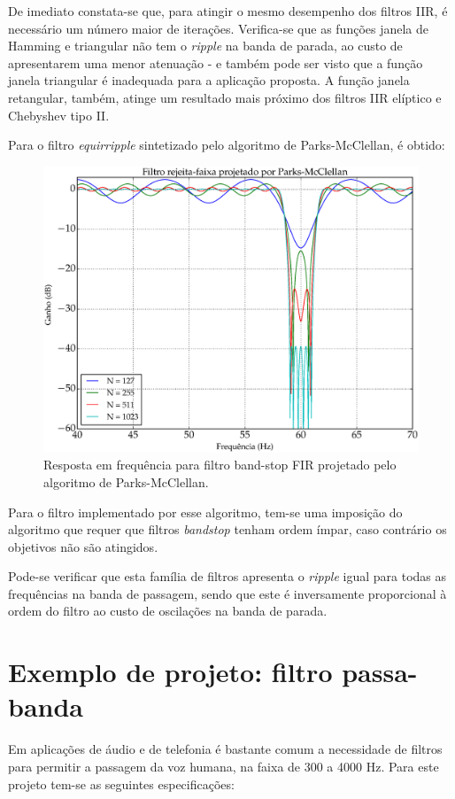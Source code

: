 De imediato constata-se que, para atingir o mesmo desempenho dos filtros IIR, é necessário um número maior de iterações. Verifica-se que as funções janela de Hamming e triangular não tem o \textit{ripple} na banda de parada, ao custo de apresentarem uma menor atenuação - e também pode ser visto que a função janela triangular é inadequada para a aplicação proposta. A função janela retangular, também, atinge um resultado mais próximo dos filtros IIR elíptico e Chebyshev tipo II.

\newpage

Para o filtro \textit{equirripple} sintetizado pelo algoritmo de Parks-McClellan, é obtido: 

\begin{figure}[H]
  \centering
  \includegraphics[scale=0.55]{images/plots/bandstop_fir_pm}
  \caption{Resposta em frequência para filtro band-stop FIR projetado pelo algoritmo de Parks-McClellan.}
  \label{fig:bandstop_FIR_pm}
\end{figure}

Para o filtro implementado por esse algoritmo, tem-se uma imposição do algoritmo que requer que filtros \textit{bandstop} tenham ordem ímpar, caso contrário os objetivos não são atingidos.

Pode-se verificar que esta família de filtros apresenta o \textit{ripple} igual para todas as frequências na banda de passagem,  sendo que este é inversamente proporcional à ordem do filtro ao custo de oscilações na banda de parada.

\newpage
\section{Exemplo de projeto: filtro passa-banda}
\label{sec:bandpass}
Em aplicações de áudio e de telefonia é bastante comum a necessidade de filtros para permitir a passagem da voz humana, na faixa de 300 a 4000 Hz. Para este projeto tem-se as seguintes especificações:

